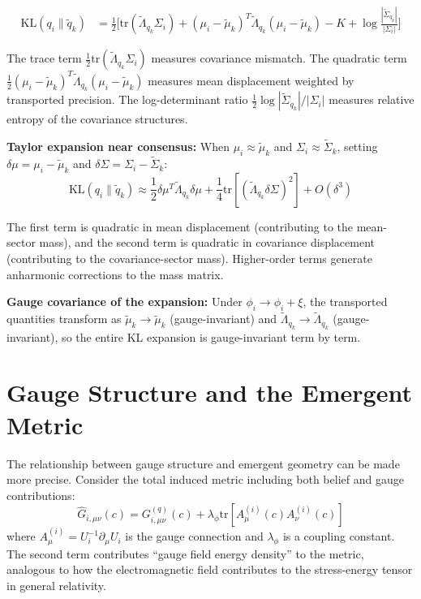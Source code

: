\documentclass[11pt]{article}
\begin{document}
\begin{align}
\mathrm{KL}(q_i \| \tilde{q}_k) &= \frac{1}{2}\Big[\mathrm{tr}(\tilde{\Lambda}_{q_k}\Sigma_i) + (\mu_i - \tilde{\mu}_k)^T\tilde{\Lambda}_{q_k}(\mu_i - \tilde{\mu}_k) - K + \log\frac{|\tilde{\Sigma}_{q_k}|}{|\Sigma_i|}\Big]
\end{align}

The trace term $\frac{1}{2}\mathrm{tr}(\tilde{\Lambda}_{q_k}\Sigma_i)$ measures covariance mismatch. The quadratic term $\frac{1}{2}(\mu_i - \tilde{\mu}_k)^T\tilde{\Lambda}_{q_k}(\mu_i - \tilde{\mu}_k)$ measures mean displacement weighted by transported precision. The log-determinant ratio $\frac{1}{2}\log|\tilde{\Sigma}_{q_k}|/|\Sigma_i|$ measures relative entropy of the covariance structures.

\textbf{Taylor expansion near consensus:} When $\mu_i \approx \tilde{\mu}_k$ and $\Sigma_i \approx \tilde{\Sigma}_k$, setting $\delta\mu = \mu_i - \tilde{\mu}_k$ and $\delta\Sigma = \Sigma_i - \tilde{\Sigma}_k$:
\begin{equation}
\mathrm{KL}(q_i \| \tilde{q}_k) \approx \frac{1}{2}\delta\mu^T\tilde{\Lambda}_{q_k}\delta\mu + \frac{1}{4}\mathrm{tr}[(\tilde{\Lambda}_{q_k}\delta\Sigma)^2] + O(\delta^3)
\end{equation}

The first term is quadratic in mean displacement (contributing to the mean-sector mass), and the second term is quadratic in covariance displacement (contributing to the covariance-sector mass). Higher-order terms generate anharmonic corrections to the mass matrix.

\textbf{Gauge covariance of the expansion:} Under $\phi_i \to \phi_i + \xi$, the transported quantities transform as $\tilde{\mu}_k \to \tilde{\mu}_k$ (gauge-invariant) and $\tilde{\Lambda}_{q_k} \to \tilde{\Lambda}_{q_k}$ (gauge-invariant), so the entire KL expansion is gauge-invariant term by term.

\section{Gauge Structure and the Emergent Metric}
\label{app:gauge_metric}

The relationship between gauge structure and emergent geometry can be made more precise. Consider the total induced metric including both belief and gauge contributions:
\begin{equation}
\hat{G}_{i,\mu\nu}(c) = G^{(q)}_{i,\mu\nu}(c) + \lambda_\phi \mathrm{tr}[A^{(i)}_\mu(c) A^{(i)}_\nu(c)]
\end{equation}
where $A^{(i)}_\mu = U_i^{-1}\partial_\mu U_i$ is the gauge connection and $\lambda_\phi$ is a coupling constant. The second term contributes ``gauge field energy density'' to the metric, analogous to how the electromagnetic field contributes to the stress-energy tensor in general relativity.
\end{document}
